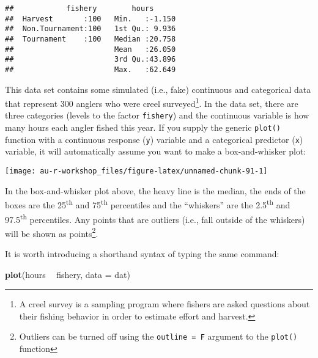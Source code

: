 \documentclass[]{book}
\newenvironment{Shaded}{\begin{snugshade}}{\end{snugshade}}
\newcommand{\KeywordTok}[1]{\textcolor[rgb]{0.13,0.29,0.53}{\textbf{#1}}}
\newcommand{\DataTypeTok}[1]{\textcolor[rgb]{0.13,0.29,0.53}{#1}}
\newcommand{\StringTok}[1]{\textcolor[rgb]{0.31,0.60,0.02}{#1}}
\newcommand{\OperatorTok}[1]{\textcolor[rgb]{0.81,0.36,0.00}{\textbf{#1}}}
\newcommand{\NormalTok}[1]{#1}
\let\rmarkdownfootnote\footnote%
\def\footnote{\protect\rmarkdownfootnote}
\theoremstyle{definition}
\theoremstyle{definition}
\theoremstyle{definition}
\theoremstyle{remark}
\begin{document}
\begin{verbatim}
##            fishery        hours       
##  Harvest       :100   Min.   :-1.150  
##  Non.Tournament:100   1st Qu.: 9.936  
##  Tournament    :100   Median :20.758  
##                       Mean   :26.050  
##                       3rd Qu.:43.896  
##                       Max.   :62.649
\end{verbatim}

This data set contains some simulated (i.e., fake) continuous and
categorical data that represent 300 anglers who were creel
surveyed\footnote{A creel survey is a sampling program where fishers are
  asked questions about their fishing behavior in order to estimate
  effort and harvest.}. In the data set, there are three categories
(levels to the factor \texttt{fishery}) and the continuous variable is
how many hours each angler fished this year. If you supply the generic
\texttt{plot()} function with a continuous response (\texttt{y})
variable and a categorical predictor (\texttt{x}) variable, it will
automatically assume you want to make a box-and-whisker plot:

\begin{Shaded}
\end{Shaded}

\begin{center}\texttt{[image: au-r-workshop\_files/figure-latex/unnamed-chunk-91-1]} \end{center}

In the box-and-whisker plot above, the heavy line is the median, the
ends of the boxes are the 25\textsuperscript{th} and
75\textsuperscript{th} percentiles and the ``whiskers'' are the
2.5\textsuperscript{th} and 97.5\textsuperscript{th} percentiles. Any
points that are outliers (i.e., fall outside of the whiskers) will be
shown as points\footnote{Outliers can be turned off using the
  \texttt{outline\ =\ F} argument to the \texttt{plot()} function}.

It is worth introducing a shorthand syntax of typing the same command:

\begin{Shaded}
\begin{Highlighting}[]
\KeywordTok{plot}\NormalTok{(hours }\OperatorTok{~}\StringTok{ }\NormalTok{fishery, }\DataTypeTok{data =}\NormalTok{ dat)}
\end{Highlighting}
\end{Shaded}
\end{document}
